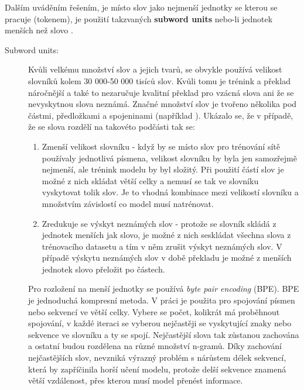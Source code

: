 Dalším uváděním řešením, je místo slov jako nejmenší jednotky se kterou se pracuje (tokenem), je použití takzvaných \textbf{subword units} nebo-li jednotek menších než slovo \cite{subwords}.

\begin{description}
  \item[Subword units:]\label{subsection:subwords} Kvůli velkému množství slov a jejich tvarů, se obvykle používá velikost slovníků kolem 30 000-50 000 tisíců slov. Kvůli tomu je trénink a překlad náročnější a také to nezaručuje kvalitní překlad pro vzácná slova ani že se nevyskytnou slova neznámá. Značné množství slov je tvořeno několika pod částmi, předložkami a spojeninami (například ). Ukázalo se, že v případě, že se slova rozdělí na takovéto podčásti tak se:
      
      \begin{enumerate}
        \item Zmenší velikost slovníku - když by se místo slov pro trénování sítě používaly jednotlivá písmena, velikost slovníku by byla jen samozřejmě nejmenší, ale trénink modelu by byl složitý. Při použití částí slov je možné z nich skládat větší celky a nemusí se tak ve slovníku vyskytovat tolik slov. Je to vhodná kombinace mezi velikostí slovníku a množstvím závislostí co model musí natrénovat.
        \item Zredukuje se výskyt neznámých slov - protože se slovník skládá z jednotek menších jak slovo, je možné z nich seskládat všechna slova z trénovacího datasetu a tím v něm zrušit výskyt neznámých slov. V případě výskytu neznámých slov v době překladu je možné z menších jednotek slovo přeložit po částech.
      \end{enumerate}
      
      Pro rozložení na menší jednotky se používá \emph{byte pair encoding} (BPE). BPE je jednoduchá kompresní metoda. V práci \cite{subwords} je použita pro spojování písmen nebo sekvencí ve větší celky. Vybere se počet, kolikrát má proběhnout spojování, v každé iteraci se vyberou nejčastěji se vyskytující znaky nebo sekvence ve slovníku a ty se spojí. Nejčastější slova tak zůstanou zachována a ostatní budou rozdělena na různé množství n-gramů. Díky zachování nejčastějších slov, nevzniká výrazný problém s nárůstem délek sekvencí, která by zapříčinila horší učení modelu, protože delší sekvence znamená větší vzdálenost, přes kterou musí model přenést informace.
\end{description}

